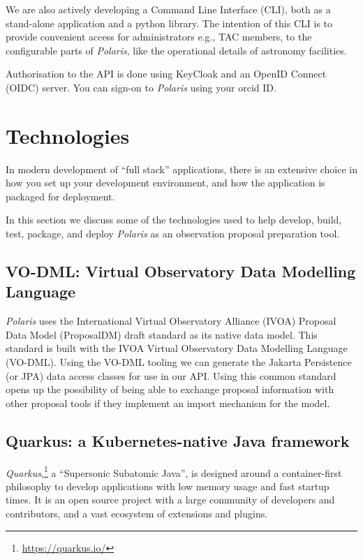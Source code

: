 \documentclass[11pt,twoside]{article}
\begin{document}
We are also actively developing a Command Line Interface (CLI), both as a stand-alone application and
a python library.
The intention of this CLI is to provide convenient access for administrators e.g., TAC members, to
the configurable parts of \emph{Polaris}, like the operational details of astronomy facilities.

Authorisation to the API is done using KeyCloak and an OpenID Connect (OIDC) server.
You can sign-on to \emph{Polaris} using your orcid ID\@.


\section{Technologies}\label{sec:technologies}

In modern development of ``full stack'' applications, there is an extensive choice in how you set up your
development environment, and how the application is packaged for deployment.

In this section we discuss some of the technologies used to help develop, build, test, package, and deploy
\emph{Polaris} as an observation proposal preparation tool.

\subsection{VO-DML: Virtual Observatory Data Modelling Language}\label{subsec:vodml}

\emph{Polaris} uses the International Virtual Observatory Alliance (IVOA) Proposal Data Model (ProposalDM)
draft standard as its native data model.
This standard is built with the IVOA Virtual Observatory Data Modelling Language (VO-DML).
Using the VO-DML tooling we can generate the Jakarta Persistence (or JPA) data access classes for use in our API\@.
Using this common standard opens up the possibility of being able to exchange proposal information with
other proposal tools if they implement an import mechanism for the model.


\subsection{Quarkus: a Kubernetes-native Java framework}\label{subsec:quarkus}

\emph{Quarkus},\footnote{\url{https://quarkus.io/}} a ``Supersonic Subatomic Java'', is designed around a
container-first philosophy to develop applications with low memory usage and fast startup times.
It is an open source project with a large community of developers and contributors, and a vast ecosystem
of extensions and plugins.
\end{document}
